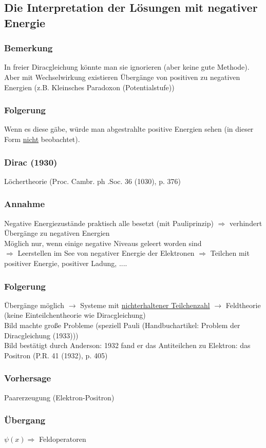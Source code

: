 \documentclass[twoside,a4paper]{scrartcl}
\renewcommand{\1}{\mathds{1}}
\newcommand{\Ra}{\Rightarrow}
\newcommand{\ra}{\rightarrow}
\begin{document}
\subsection{Die Interpretation der Lösungen mit negativer Energie}
\subsubsection*{Bemerkung}
In freier Diracgleichung könnte man sie ignorieren (aber keine gute Methode). Aber mit Wechselwirkung existieren Übergänge von positiven zu negativen Energien (z.B. Kleinsches Paradoxon (Potentialstufe))
\subsubsection*{Folgerung}
Wenn es diese gäbe, würde man abgestrahlte positive Energien sehen (in dieser Form \underline{nicht} beobachtet).
\subsubsection*{Dirac (1930)}
Löchertheorie (Proc. Cambr. ph .Soc. 36 (1030), p. 376)
\subsubsection*{Annahme}
Negative Energiezustände praktisch alle besetzt (mit Pauliprinzip) $\Ra$ verhindert Übergänge zu negativen Energien\\
Möglich nur, wenn einige negative Niveaus geleert worden sind \\
$\Ra$ Leerstellen im See von negativer Energie der Elektronen $\Ra$ Teilchen mit positiver Energie, positiver Ladung, ....
\subsubsection*{Folgerung}
Übergänge möglich $\ra$ Systeme mit \underline{nichterhaltener Teilchenzahl} $\ra$ Feldtheorie (keine Einteilchentheorie wie Diracgleichung)\\
Bild machte große Probleme (speziell Pauli (Handbuchartikel: Problem der Diracgleichung (1933)))\\
Bild bestätigt durch Anderson: 1932 fand er das Antiteilchen zu Elektron: das Positron (P.R. 41 (1932), p. 405)
\subsubsection*{Vorhersage}
Paarerzeugung (Elektron-Positron)
\subsubsection*{Übergang}
$ \psi(x) \Ra$ Feldoperatoren 
\end{document}
